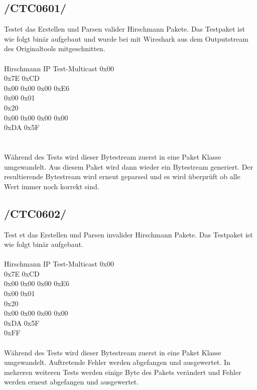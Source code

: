 \subsection{/CTC0601/} 
Testet das Erstellen und Parsen valider Hirschmann Pakete. Das Testpaket ist wie folgt binär aufgebaut
und wurde bei mit Wireshark aus dem Outputstream des Originaltools mitgeschnitten.
\\\\
Hirschmann IP Test-Multicast 0x00   \\
0x7E 0xCD                           \\
0x00 0x00 0x00 0xE6                \\
0x00 0x01                           \\
0x20                                 \\
0x00 0x00 0x00 0x00                  \\
0xDA 0x5F                            \\
\\\\
Während des Tests wird dieser Bytestream zuerst in eine Paket Klasse umgewandelt.
Aus diesem Paket wird dann wieder ein Bytestream generiert. Der resultierende Bytestream
wird erneut geparsed und es wird überprüft ob alle Wert immer noch korrekt sind.

\subsection{/CTC0602/} 
Test
et das Erstellen und Parsen invalider Hirschmann Pakete. Das Testpaket ist wie folgt binär aufgebaut.
\\\\
Hirschmann IP Test-Multicast 0x00   \\
0x7E 0xCD                           \\
0x00 0x00 0x00 0xE6 \\
0x00 0x01                                \\
0x20                      \\                   
0x00 0x00 0x00 0x00     \\
0xDA 0x5F\\
0xFF                    
\\\\ 
Während des Tests wird dieser Bytestream zuerst in eine Paket Klasse umgewandelt.
Auftretende Fehler werden abgefangen und ausgewertet. In mehreren weiteren Tests
werden einige Byte des Pakets verändert und Fehler werden erneut abgefangen und ausgewertet.

